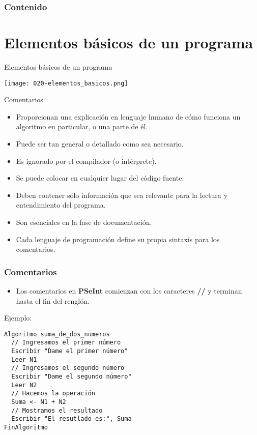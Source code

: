 \begin{frame}
    \frametitle{Contenido}
    \tableofcontents
\end{frame}

\section{Elementos básicos de un programa}

\begin{frame}[c]{Elementos básicos de un programa}
  \begin{center}
    \texttt{[image: 020-elementos\_basicos.png]}
  \end{center}
\end{frame}

\begin{frame}[c]{Comentarios}
  \begin{itemize}
    \item Proporcionan una explicación en lenguaje humano de cómo
      funciona un algoritmo en particular, o una parte de él.
    \pausa
    \item Puede ser tan general o detallado como sea necesario.
    \pausa
    \item Es ignorado por el compilador (o intérprete).
    \pausa
    \item Se puede colocar en cualquier lugar del código fuente.
    \pausa
    \item Deben contener sólo información que sea relevante para la
      lectura y entendimiento del programa.
    \pausa
    \item Son esenciales en la fase de documentación.
    \pausa
    \item Cada lenguaje de programación define su propia sintaxis para los
      comentarios.
  \end{itemize}
\end{frame}

\begin{frame}[fragile]
  \frametitle{Comentarios}
  \begin{itemize}
    \item Los comentarios en \textbf{PSeInt} comienzan con los caracteres
      \textbf{//} y terminan hasta el fin del renglón.
  \end{itemize}
  \pausa
  Ejemplo:
  \begin{lstlisting}[style=pseudocodigo]
Algoritmo suma_de_dos_numeros
  // Ingresamos el primer número
  Escribir "Dame el primer número"
  Leer N1
  // Ingresamos el segundo número
  Escribir "Dame el segundo número"
  Leer N2
  // Hacemos la operación
  Suma <- N1 + N2
  // Mostramos el resultado
  Escribir "El resutlado es:", Suma
FinAlgoritmo
  \end{lstlisting}
\end{frame}

